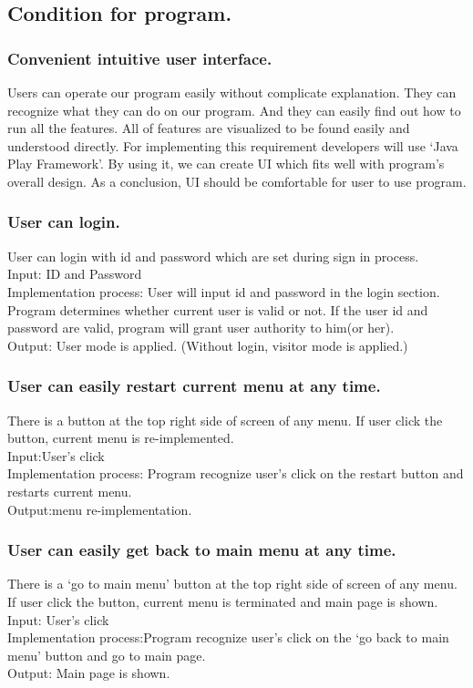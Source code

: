 \documentclass[10pt,journal,compsoc]{IEEEtran}
\begin{document}
\subsection{Condition for program.}
\subsubsection{Convenient intuitive user interface.\\}
Users can operate our program easily without complicate explanation. They can recognize what they can do on our program. And they can easily find out how to run all the features. All of features are visualized to be found easily and understood directly.
For implementing this requirement developers will use ‘Java Play Framework’. By using it, we can create UI which fits well with program's overall design. As a conclusion, UI should be comfortable for user to use program.

\subsubsection{User can login.\\}
User can login with id and password which are set during sign in process.
\\Input: ID and Password
\\Implementation process: User will input id and password in the login section. Program determines whether current user is valid or not. If the user id and password are valid, program will grant user authority to him(or her).
\\Output: User mode is applied. (Without login, visitor mode is applied.)

\subsubsection {User can easily restart current menu at any time.\\}
There is a button at the top right side of screen of any menu. If user click the button, current menu is re-implemented.
\\Input:User’s click
\\Implementation process: Program recognize user’s click on the restart button and restarts current menu.
\\Output:menu re-implementation.

\subsubsection{ User can easily get back to main menu at any time.}
There is a ‘go to main menu’ button at the top right side of screen of any menu. If user click the button, current menu is terminated and main page is shown.
Input: User’s click
\\Implementation process:Program recognize user’s click on the ‘go back to main menu’ button and go to main page.
\\Output: Main page is shown.
\end{document}
